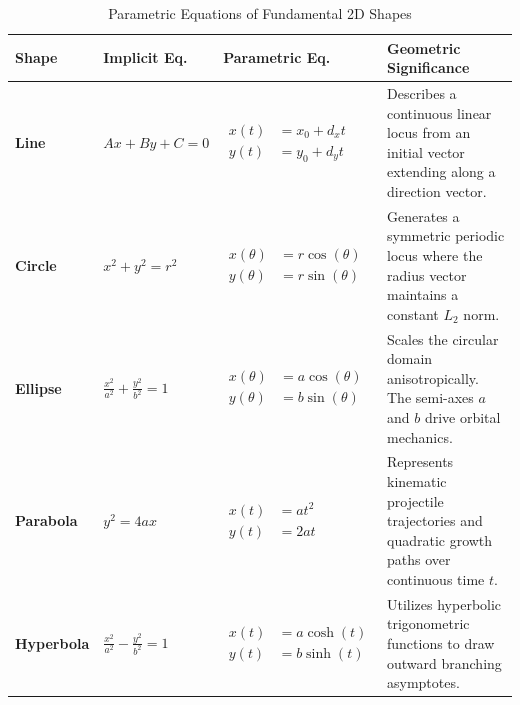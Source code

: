 \documentclass[12pt, a4paper]{report}
\begin{document}
\begin{table}[htbp]
    \centering
    \renewcommand{\arraystretch}{1.8}
    \caption{Parametric Equations of Fundamental 2D Shapes}
    \label{tab:2d_param}
    \begin{tabular}{@{} l p{3.2cm} p{4.2cm} p{5cm} @{}}
        \toprule
        \textbf{Shape} & \textbf{Implicit Eq.} & \textbf{Parametric Eq.} & \textbf{Geometric Significance} \\
        \midrule
        \textbf{Line} & $Ax + By + C = 0$ & $\begin{aligned} x(t) &= x_0 + d_x t \\ y(t) &= y_0 + d_y t \end{aligned}$ & Describes a continuous linear locus from an initial vector extending along a direction vector. \\
        
        \textbf{Circle} & $x^2 + y^2 = r^2$ & $\begin{aligned} x(\theta) &= r \cos(\theta) \\ y(\theta) &= r \sin(\theta) \end{aligned}$ & Generates a symmetric periodic locus where the radius vector maintains a constant $L_2$ norm. \\
        
        \textbf{Ellipse} & $\frac{x^2}{a^2} + \frac{y^2}{b^2} = 1$ & $\begin{aligned} x(\theta) &= a \cos(\theta) \\ y(\theta) &= b \sin(\theta) \end{aligned}$ & Scales the circular domain anisotropically. The semi-axes $a$ and $b$ drive orbital mechanics. \\
        
        \textbf{Parabola} & $y^2 = 4ax$ & $\begin{aligned} x(t) &= a t^2 \\ y(t) &= 2a t \end{aligned}$ & Represents kinematic projectile trajectories and quadratic growth paths over continuous time $t$. \\
        
        \textbf{Hyperbola} & $\frac{x^2}{a^2} - \frac{y^2}{b^2} = 1$ & $\begin{aligned} x(t) &= a \cosh(t) \\ y(t) &= b \sinh(t) \end{aligned}$ & Utilizes hyperbolic trigonometric functions to draw outward branching asymptotes. \\
        \bottomrule
    \end{tabular}
\end{table}
\end{document}
